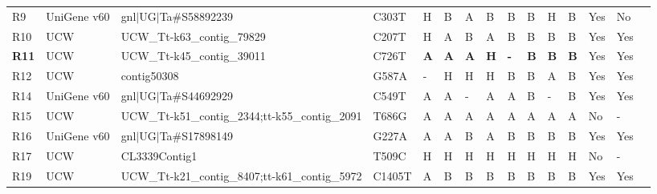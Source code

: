 \begin{sidewaystable}
\begin{localsize}{6}{9}
\begin{tabular}{llllllll!{\extracolsep{4pt}}lllllll}
 R9         & UniGene v60 & gnl$|$UG$|$Ta\#S58892239                                             & C303T  & H      & B         & A        & B        & B            & B         & H         & B     & Yes           & No                     &                         \\
 R10        & UCW         & UCW\_Tt-k63\_contig\_79829                                         & C207T  & H      & A         & B        & A        & B            & B         & B         & B     & Yes           & Yes                    &                         \\
 \textbf{R11}        & UCW         & UCW\_Tt-k45\_contig\_39011                                         & C726T  & \textbf{A}       & \textbf{A}          & \textbf{A}         & \textbf{H}         & \textbf{-}             & \textbf{B}          & \textbf{B}         & \textbf{B}     & Yes           & Yes                    &                         \\
  R12        & UCW         & contig50308                                                     & G587A  & -      & H         & H        & H        & B            & B         & A         & B     & Yes           & Yes                    &                         \\
 R14        & UniGene v60 & gnl$|$UG$|$Ta\#S44692929                                             & C549T  & A      & A         & -        & A        & A            & B         & -         & B     & Yes           & Yes                    &                         \\
 R15        & UCW         & UCW\_Tt-k51\_contig\_2344;tt-k55\_contig\_2091                       & T686G  & A      & A         & A        & A        & A            & A         & A         & A     & No            & -                      &                         \\
 R16        & UniGene v60 & gnl$|$UG$|$Ta\#S17898149                                             & G227A  & A      & A         & B        & A        & B            & B         & B         & B     & Yes           & Yes                    &                         \\
 R17        & UCW         & CL3339Contig1                                                   & T509C  & H      & H         & H        & H        & H            & H         & H         & H     & No            & -                      &                         \\
 R19        & UCW         & UCW\_Tt-k21\_contig\_8407;tt-k61\_contig\_5972                       & C1405T & A      & B         & B        & B        & B            & B         & B         & B     & Yes           & Yes                    &                         \\

\end{tabular}
\end{localsize}
\end{sidewaystable}
